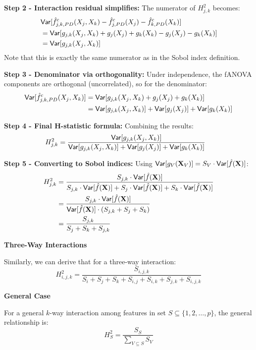 {\textbf{Step 2 - Interaction residual simplifies:} The numerator of $H_{j,k}^2$ becomes:
\begin{align*}
&\mathsf{Var}[\hat{f}_{j,k,PD}^c(X_j, X_k) - \hat{f}_{j,PD}^c(X_j) - \hat{f}_{k,PD}^c(X_k)] \\
&= \mathsf{Var}[g_{j,k}(X_j, X_k) + g_j(X_j) + g_k(X_k) - g_j(X_j) - g_k(X_k)] \\
&= \mathsf{Var}[g_{j,k}(X_j, X_k)]
\end{align*}
Note that this is exactly the same numerator as in the Sobol index definition.

\textbf{Step 3 - Denominator via orthogonality:} Under independence, the fANOVA components are orthogonal (uncorrelated), so for the denominator:
\begin{align*}
\mathsf{Var}[\hat{f}_{j,k,PD}^c(X_j, X_k)] &= \mathsf{Var}[g_{j,k}(X_j, X_k) + g_j(X_j) + g_k(X_k)] \\
&= \mathsf{Var}[g_{j,k}(X_j, X_k)] + \mathsf{Var}[g_j(X_j)] + \mathsf{Var}[g_k(X_k)]
\end{align*}

\textbf{Step 4 - Final H-statistic formula:} Combining the results:
\begin{align*}
H_{j,k}^2 &= \frac{\mathsf{Var}[g_{j,k}(X_j, X_k)]}{\mathsf{Var}[g_{j,k}(X_j, X_k)] + \mathsf{Var}[g_j(X_j)] + \mathsf{Var}[g_k(X_k)]}
\end{align*}

\textbf{Step 5 - Converting to Sobol indices:} Using $\mathsf{Var}[g_V(\mathbf{X}_V)] = S_V \cdot \mathsf{Var}[\hat{f}(\mathbf{X})]$:
\begin{align*}
H_{j,k}^2 &= \frac{S_{j,k} \cdot \mathsf{Var}[\hat{f}(\mathbf{X})]}{S_{j,k} \cdot \mathsf{Var}[\hat{f}(\mathbf{X})] + S_j \cdot \mathsf{Var}[\hat{f}(\mathbf{X})] + S_k \cdot \mathsf{Var}[\hat{f}(\mathbf{X})]} \\
&= \frac{S_{j,k} \cdot \mathsf{Var}[\hat{f}(\mathbf{X})]}{\mathsf{Var}[\hat{f}(\mathbf{X})] \cdot (S_{j,k} + S_j + S_k)} \\
&= \frac{S_{j,k}}{S_j + S_k + S_{j,k}}
\end{align*}

\textbf{Three-Way Interactions}

Similarly, we can derive that for a three-way interaction:
\[
H_{i,j,k}^2 = \frac{S_{i,j,k}}{S_i + S_j + S_k + S_{i,j} + S_{i,k} + S_{j,k} + S_{i,j,k}}
\]

\textbf{General Case}

For a general $k$-way interaction among features in set $S \subseteq \{1, 2, \ldots, p\}$, the general relationship is:
\[
H_S^2 = \frac{S_S}{\sum_{V \subseteq S} S_V}
\]

}